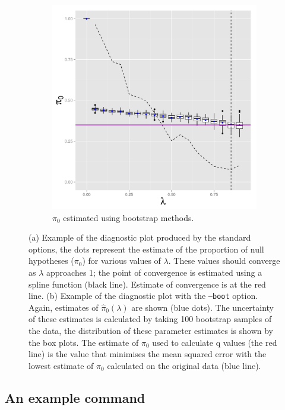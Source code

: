 \documentclass{amsart}
\begin{document}
\begin{figure}
\begin{subfigure}[b]{0.5\textwidth}
    \includegraphics[width=\textwidth]{boot_diagnostic}
   \caption{$\pi_0$ estimated using bootstrap methods.}
   \label{fig:boot_param}
  \end{subfigure}
    \caption{(a) Example of the diagnostic plot produced by the standard
      options, the dots represent the estimate of the proportion of
      null hypotheses ($\pi_0$) for various values of $\lambda$. These
      values should converge as $\lambda$ approaches 1; the point of
      convergence is estimated using a spline function (black
     line). Estimate of convergence is at the red line. (b) Example of the diagnostic plot with the \texttt{--boot}
      option. Again, estimates of $\hat{\pi}_0(\lambda)$ are shown (blue dots). The uncertainty of these estimates
      is calculated by taking 100 bootstrap samples of the data, the
      distribution of these parameter estimates is shown by the box
      plots. The estimate of $\pi_0$ used to calculate q values (the
      red line) is the value that minimises the mean squared error
      with the lowest estimate of $\pi_0$ calculated on the original
      data (blue line).}
\label{fig:diagplot}
\end{figure}

\subsection{An example command}
\end{document}
